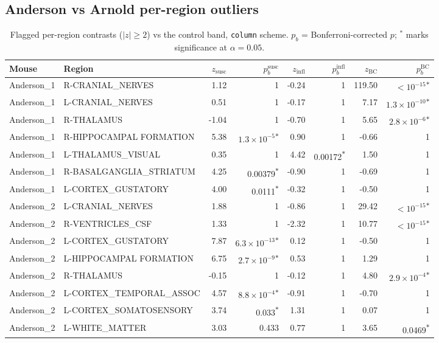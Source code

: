 \subsection{Anderson vs Arnold per-region outliers}
\begin{table}[H]\centering\small
\caption{Flagged per-region contrasts ($|z|\ge2$) vs the control band, \texttt{column} scheme. $p_b$ = Bonferroni-corrected $p$; $^{\ast}$ marks significance at $\alpha=0.05$.}
\begin{tabular}{@{}llrrrrrr@{}}\toprule
Mouse & Region & $z_{\mathrm{susc}}$ & $p_b^{\mathrm{susc}}$ & $z_{\mathrm{infl}}$ & $p_b^{\mathrm{infl}}$ & $z_{\mathrm{BC}}$ & $p_b^{\mathrm{BC}}$ \\\midrule
Anderson\_1 & R-CRANIAL\_NERVES & 1.12 & 1 & -0.24 & 1 & 119.50 & $<\!10^{-15}$\textsuperscript{$\ast$} \\
Anderson\_1 & L-CRANIAL\_NERVES & 0.51 & 1 & -0.17 & 1 & 7.17 & $1.3\!\times\!10^{-10}$\textsuperscript{$\ast$} \\
Anderson\_1 & R-THALAMUS & -1.04 & 1 & -0.70 & 1 & 5.65 & $2.8\!\times\!10^{-6}$\textsuperscript{$\ast$} \\
Anderson\_1 & R-HIPPOCAMPAL FORMATION & 5.38 & $1.3\!\times\!10^{-5}$\textsuperscript{$\ast$} & 0.90 & 1 & -0.66 & 1 \\
Anderson\_1 & L-THALAMUS\_VISUAL & 0.35 & 1 & 4.42 & 0.00172\textsuperscript{$\ast$} & 1.50 & 1 \\
Anderson\_1 & R-BASALGANGLIA\_STRIATUM & 4.25 & 0.00379\textsuperscript{$\ast$} & -0.90 & 1 & -0.69 & 1 \\
Anderson\_1 & L-CORTEX\_GUSTATORY & 4.00 & 0.0111\textsuperscript{$\ast$} & -0.32 & 1 & -0.50 & 1 \\
Anderson\_2 & L-CRANIAL\_NERVES & 1.88 & 1 & -0.86 & 1 & 29.42 & $<\!10^{-15}$\textsuperscript{$\ast$} \\
Anderson\_2 & R-VENTRICLES\_CSF & 1.33 & 1 & -2.32 & 1 & 10.77 & $<\!10^{-15}$\textsuperscript{$\ast$} \\
Anderson\_2 & L-CORTEX\_GUSTATORY & 7.87 & $6.3\!\times\!10^{-13}$\textsuperscript{$\ast$} & 0.12 & 1 & -0.50 & 1 \\
Anderson\_2 & L-HIPPOCAMPAL FORMATION & 6.75 & $2.7\!\times\!10^{-9}$\textsuperscript{$\ast$} & 0.53 & 1 & 1.29 & 1 \\
Anderson\_2 & R-THALAMUS & -0.15 & 1 & -0.12 & 1 & 4.80 & $2.9\!\times\!10^{-4}$\textsuperscript{$\ast$} \\
Anderson\_2 & L-CORTEX\_TEMPORAL\_ASSOC & 4.57 & $8.8\!\times\!10^{-4}$\textsuperscript{$\ast$} & -0.91 & 1 & -0.70 & 1 \\
Anderson\_2 & L-CORTEX\_SOMATOSENSORY & 3.74 & 0.033\textsuperscript{$\ast$} & 1.31 & 1 & 0.07 & 1 \\
Anderson\_2 & L-WHITE\_MATTER & 3.03 & 0.433 & 0.77 & 1 & 3.65 & 0.0469\textsuperscript{$\ast$} \\
\bottomrule\end{tabular}\end{table}

